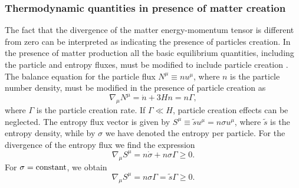 \documentclass[aps,superscriptaddress, showpacs,preprintnumbers, superscriptaddress, nofootinbibt,twocolumn]{revtex4}
\begin{document}
\subsubsection{Thermodynamic quantities in presence of matter creation}

The fact that the divergence of the matter energy-momentum tensor is different from zero can be interpreted as indicating the presence of particles creation. In the presence of matter production all the basic equilibrium quantities, including the particle and entropy fluxes, must be modified to
include particle creation \cite{P-M,Lima,Su}. The balance equation for the particle flux
$N^{\mu} \equiv nu^{\mu}$, where $n$ is the particle number density, must be modified in the presence of particle creation as
\begin{equation}
\nabla _{\mu}N^{\mu}=\dot{n}+3Hn=n\Gamma,
\end{equation}
where $\Gamma $ is the particle creation rate. If $\Gamma \ll H$, particle creation effects can be neglected. The entropy flux vector is given by $S^{\mu} \equiv \tilde{s}u^{\mu} = n\sigma u^{\mu}$, where $\tilde{s}$ is the entropy density, while by $%
\sigma $ we have denoted the entropy per particle. For the divergence of the entropy flux we find the expression
\begin{equation}\label{62b}
\nabla _{\mu}S^{\mu}=n\dot{\sigma}+n\sigma \Gamma\geq 0.
\end{equation}
For $\sigma ={\rm constant}$, we obtain
\begin{equation}
\nabla _{\mu}S^{\mu}=n\sigma \Gamma =\tilde{s}\Gamma \geq 0.
\end{equation}
\end{document}
